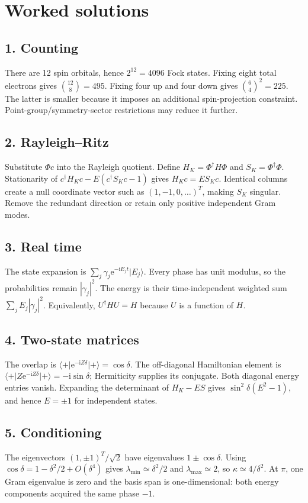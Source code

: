 \documentclass[11pt,a4paper,oneside]{report}
\newcommand{\ket}[1]{\lvert #1\rangle}
\newcommand{\bra}[1]{\langle #1\rvert}
\newcommand{\I}{\mathrm i}
\newcommand{\e}{\mathrm e}
\begin{document}
\appendix
\chapter{Worked solutions}
\section*{1. Counting}
There are 12 spin orbitals, hence $2^{12}=4096$ Fock states. Fixing eight total electrons gives $\binom{12}{8}=495$. Fixing four up and four down gives $\binom64^2=225$. The latter is smaller because it imposes an additional spin-projection constraint. Point-group/symmetry-sector restrictions may reduce it further.

\section*{2. Rayleigh--Ritz}
Substitute $\Phi c$ into the Rayleigh quotient. Define $H_K=\Phi^\dagger H\Phi$ and $S_K=\Phi^\dagger\Phi$. Stationarity of $c^\dagger H_Kc-E(c^\dagger S_Kc-1)$ gives $H_Kc=ES_Kc$. Identical columns create a null coordinate vector such as $(1,-1,0,\ldots)^T$, making $S_K$ singular. Remove the redundant direction or retain only positive independent Gram modes.

\section*{3. Real time}
The state expansion is $\sum_j\gamma_j\e^{-\I E_jt}\ket{E_j}$. Every phase has unit modulus, so the probabilities remain $|\gamma_j|^2$. The energy is their time-independent weighted sum $\sum_jE_j|\gamma_j|^2$. Equivalently, $U^\dagger HU=H$ because $U$ is a function of $H$.

\section*{4. Two-state matrices}
The overlap is $\bra+\e^{-\I Z\delta}\ket+=\cos\delta$. The off-diagonal Hamiltonian element is $\bra+Z\e^{-\I Z\delta}\ket+=-\I\sin\delta$; Hermiticity supplies its conjugate. Both diagonal energy entries vanish. Expanding the determinant of $H_K-ES$ gives $\sin^2\delta(E^2-1)$, and hence $E=\pm1$ for independent states.

\section*{5. Conditioning}
The eigenvectors $(1,\pm1)^T/\sqrt2$ have eigenvalues $1\pm\cos\delta$. Using $\cos\delta=1-\delta^2/2+O(\delta^4)$ gives $\lambda_{\min}\simeq\delta^2/2$ and $\lambda_{\max}\simeq2$, so $\kappa\simeq4/\delta^2$. At $\pi$, one Gram eigenvalue is zero and the basis span is one-dimensional: both energy components acquired the same phase $-1$.
\end{document}
